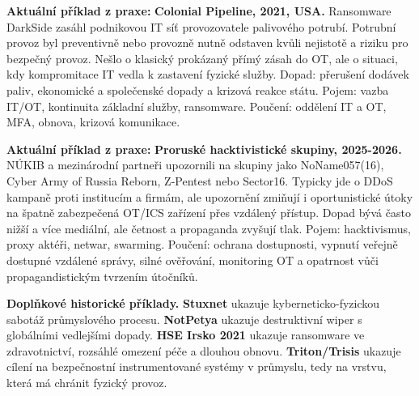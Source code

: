 \documentclass[11pt,a4paper]{article}
\newcommand{\aktualni}[1]{\begin{tcolorbox}[breakable,enhanced,colback=green!10,colframe=green!35!black,boxrule=0pt,arc=1mm,left=5pt,right=5pt,top=5pt,bottom=5pt,before skip=6pt,after skip=6pt]\textbf{Aktuální příklad z praxe:} #1\end{tcolorbox}}
\begin{document}
\aktualni{\textbf{Colonial Pipeline, 2021, USA.} Ransomware DarkSide zasáhl podnikovou IT síť provozovatele palivového potrubí. Potrubní provoz byl preventivně nebo provozně nutně odstaven kvůli nejistotě a riziku pro bezpečný provoz. Nešlo o klasický prokázaný přímý zásah do OT, ale o situaci, kdy kompromitace IT vedla k zastavení fyzické služby. Dopad: přerušení dodávek paliv, ekonomické a společenské dopady a krizová reakce státu. Pojem: vazba IT/OT, kontinuita základní služby, ransomware. Poučení: oddělení IT a OT, MFA, obnova, krizová komunikace.}

\aktualni{\textbf{Proruské hacktivistické skupiny, 2025-2026.} NÚKIB a mezinárodní partneři upozornili na skupiny jako NoName057(16), Cyber Army of Russia Reborn, Z-Pentest nebo Sector16. Typicky jde o DDoS kampaně proti institucím a firmám, ale upozornění zmiňují i oportunistické útoky na špatně zabezpečená OT/ICS zařízení přes vzdálený přístup. Dopad bývá často nižší a více mediální, ale četnost a propaganda zvyšují tlak. Pojem: hacktivismus, proxy aktéři, netwar, swarming. Poučení: ochrana dostupnosti, vypnutí veřejně dostupné vzdálené správy, silné ověřování, monitoring OT a opatrnost vůči propagandistickým tvrzením útočníků.}

\textbf{Doplňkové historické příklady.} \textbf{Stuxnet} ukazuje kyberneticko-fyzickou sabotáž průmyslového procesu. \textbf{NotPetya} ukazuje destruktivní wiper s globálními vedlejšími dopady. \textbf{HSE Irsko 2021} ukazuje ransomware ve zdravotnictví, rozsáhlé omezení péče a dlouhou obnovu. \textbf{Triton/Trisis} ukazuje cílení na bezpečnostní instrumentované systémy v průmyslu, tedy na vrstvu, která má chránit fyzický provoz.
\end{document}
